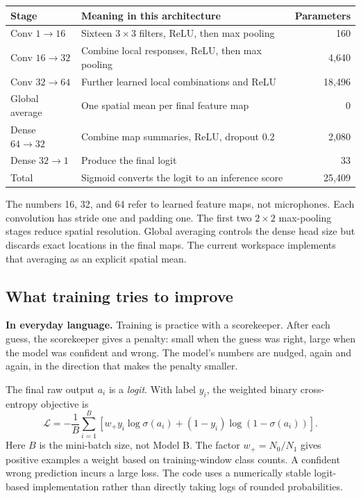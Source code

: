 \documentclass[11pt,letterpaper]{article}
\newcommand{\plain}[1]{\par\smallskip\noindent\textbf{In everyday language.} #1\par\smallskip}
\begin{document}
\begin{center}
\small
\begin{tabularx}{\linewidth}{@{}lYr@{}}
\toprule
Stage & Meaning in this architecture & Parameters \\
\midrule
Conv $1\rightarrow16$ & Sixteen $3\times3$ filters, ReLU, then max pooling & 160 \\
Conv $16\rightarrow32$ & Combine local responses, ReLU, then max pooling & 4,640 \\
Conv $32\rightarrow64$ & Further learned local combinations and ReLU & 18,496 \\
Global average & One spatial mean per final feature map & 0 \\
Dense $64\rightarrow32$ & Combine map summaries, ReLU, dropout 0.2 & 2,080 \\
Dense $32\rightarrow1$ & Produce the final logit & 33 \\
\midrule
Total & Sigmoid converts the logit to an inference score & 25,409 \\
\bottomrule
\end{tabularx}
\end{center}
The numbers 16, 32, and 64 refer to learned feature maps, not microphones.
Each convolution has stride one and padding one. The first two $2\times2$
max-pooling stages reduce spatial resolution. Global averaging controls the
dense head size but discards exact locations in the final maps. The current
workspace implements that averaging as an explicit spatial mean.

\subsection{What training tries to improve}
\plain{Training is practice with a scorekeeper. After each guess, the
scorekeeper gives a penalty: small when the guess was right, large when the
model was confident and wrong. The model's numbers are nudged, again and again,
in the direction that makes the penalty smaller.}

The final raw output $a_i$ is a \emph{logit}. With label $y_i$, the weighted
binary cross-entropy objective is
\begin{equation}
 \mathcal L=-\frac{1}{B}\sum_{i=1}^{B}
 \left[w_+y_i\log\sigma(a_i)+(1-y_i)\log(1-\sigma(a_i))\right].
\end{equation}
Here $B$ is the mini-batch size, not Model B. The factor
$w_+=N_0/N_1$ gives positive examples a weight based on training-window
class counts. A confident wrong prediction incurs a large loss. The code uses
a numerically stable logit-based implementation rather than directly taking
logs of rounded probabilities.
\end{document}
